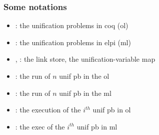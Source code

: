 \documentclass{pres}
\newcommand{\sepFrame}[1]{
  \section{#1}
  \begin{frame}
    \centering
    {\usebeamerfont*{frametitle}\usebeamercolor[fg]{frametitle} #1}
  \end{frame}
}
\begin{document}


\def\llam{\ensuremath{{\mathcal{L}_\lambda}}\xspace}
\begin{frame}
  \frametitle{Some notations}

  \begin{itemize}
    \item \foUnifPb: the unification problems in coq (ol)
    \item \hoUnifPb: the unification problems in elpi (ml)
    \item \linkStore, \mapStore: the link store, the unification-variable map
  \end{itemize}

  \mysep

  \begin{itemize}
    \item {}: the run of $n$ unif pb in the ol
    \item {}: the run of $n$ unif pb in the ml
    \item {}: the execution of the $i^{th}$ unif pb in ol
    \item {}: the exec of the $i^{th}$ unif pb in ml
  \end{itemize}


\end{frame}
\end{document}
